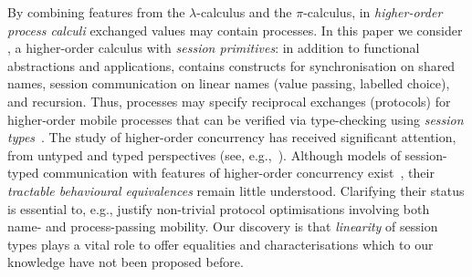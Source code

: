 \noindent
By combining features from the $\lambda$-calculus and the $\pi$-calculus, 
in \emph{higher-order process calculi} exchanged values may contain  processes. 
In this paper we consider \HOp, a higher-order calculus with \emph{session primitives}:
in addition to 
functional
abstractions and applications, \HOp 
contains constructs for 
synchronisation on shared names, 
  session communication on linear names (value passing, 
labelled choice), and recursion.
Thus, \HOp processes may specify reciprocal exchanges (protocols) 
for higher-order mobile processes that
 can be verified via type-checking using \emph{session types}~\cite{honda.vasconcelos.kubo:language-primitives}.
The study of higher-order concurrency has received significant attention, 
from untyped and typed perspectives (see, e.g.,~\cite{ThomsenB:plachoasgcfhop,SangiorgiD:expmpa,JeffreyR05,MostrousY15,DBLP:journals/iandc/LanesePSS11,DBLP:conf/icalp/LanesePSS10,DBLP:conf/esop/KoutavasH11,XuActa2012}).
Although models of session-typed 
communication with features of higher-order concurrency exist~\cite{tlca07,DBLP:journals/jfp/GayV10},
their  \emph{tractable behavioural equivalences} 
remain little understood. 
Clarifying their status is essential to, e.g., 
justify non-trivial protocol optimisations involving both name- and process-passing mobility.
Our discovery is that \emph{linearity} of session types plays a vital role to 
offer equalities and characterisations
which to our knowledge have not been proposed before.   

